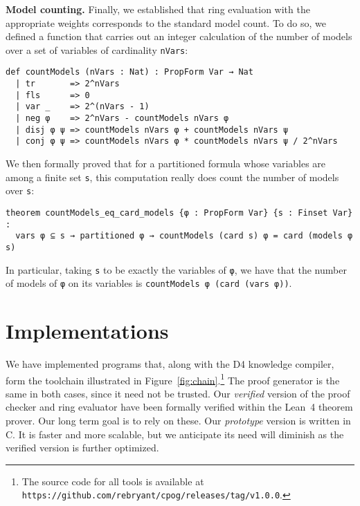 \documentclass[twoside,11pt]{article}
\newcommand{\url}[1]{\texttt{#1}}
\newcommand{\progname}[1]{\textsc{#1}}
\newcommand{\dfour}{\progname{D4}}
\newcommand{\lean}{Lean~4}
\begin{document}
\vspace{1em}\noindent
\textbf{Model counting.} Finally, we established that ring evaluation with the appropriate weights
corresponds to the standard model count. To do so, we defined a function that
carries out an integer calculation of the number of models over a set of variables
of cardinality \lstinline{nVars}:
\begin{lstlisting}
def countModels (nVars : Nat) : PropForm Var → Nat
  | tr       => 2^nVars
  | fls      => 0
  | var _    => 2^(nVars - 1)
  | neg φ    => 2^nVars - countModels nVars φ
  | disj φ ψ => countModels nVars φ + countModels nVars ψ
  | conj φ ψ => countModels nVars φ * countModels nVars ψ / 2^nVars
\end{lstlisting}
We then formally proved that for a partitioned formula whose variables are among a finite set
\lstinline{s}, this computation really does count the number of models over \lstinline{s}:
\begin{lstlisting}
theorem countModels_eq_card_models {φ : PropForm Var} {s : Finset Var} :
  vars φ ⊆ s → partitioned φ → countModels (card s) φ = card (models φ s)
\end{lstlisting}
In particular, taking \lstinline{s} to be exactly the variables of \lstinline{φ},
we have that the number of models of \lstinline{φ} on its variables is
\lstinline{countModels φ (card (vars φ))}.


\section{Implementations}
We have implemented programs that, along with
the \dfour{} knowledge compiler, form the toolchain illustrated in
Figure~\ref{fig:chain}.\footnote{The source code for all tools
is available at \url{https://github.com/rebryant/cpog/releases/tag/v1.0.0}.}  The proof generator is the same in both
cases, since it need not be trusted.
Our \emph{verified}
version of the proof checker and ring evaluator have been formally
verified within the \lean{} theorem prover.  Our long term goal is to
rely on these.  Our \emph{prototype} version is written in C\@.
It is faster and
more scalable, but we anticipate its need will diminish as the
verified version is further optimized.
\end{document}

